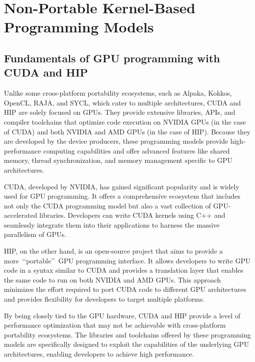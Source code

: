 \section{Non-Portable Kernel-Based Programming Models}


\subsection{Fundamentals of GPU programming with CUDA and HIP}


\par
Unlike some cross-platform portability ecosystems, such as Alpaka, Kokkos, OpenCL, RAJA, and SYCL, which cater to multiple architectures, CUDA and HIP are solely focused on GPUs.
They provide extensive libraries, APIs, and compiler toolchains that optimize code execution on NVIDIA GPUs (in the case of CUDA) and both NVIDIA and AMD GPUs (in the case of HIP).
Because they are developed by the device producers, these programming models provide high-performance computing capabilities and offer advanced features like shared memory, thread synchronization, and memory management specific to GPU architectures.


\par
CUDA, developed by NVIDIA, has gained significant popularity and is widely used for GPU programming.
It offers a comprehensive ecosystem that includes not only the CUDA programming model but also a vast collection of GPU-accelerated libraries.
Developers can write CUDA kernels using C++ and seamlessly integrate them into their applications to harness the massive parallelism of GPUs.


\par
HIP, on the other hand, is an open-source project that aims to provide a more~\lq\lq portable\rq\rq~GPU programming interface.
It allows developers to write GPU code in a syntax similar to CUDA and provides a translation layer that enables the same code to run on both NVIDIA and AMD GPUs.
This approach minimizes the effort required to port CUDA code to different GPU architectures and provides flexibility for developers to target multiple platforms.


\par
By being closely tied to the GPU hardware, CUDA and HIP provide a level of performance optimization that may not be achievable with cross-platform portability ecosystems.
The libraries and toolchains offered by these programming models are specifically designed to exploit the capabilities of the underlying GPU architectures, enabling developers to achieve high performance.


